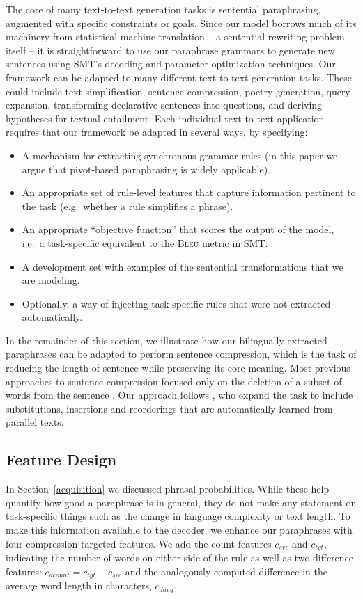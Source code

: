 \documentclass[11pt]{article}
\begin{document}
The core of many text-to-text generation tasks is sentential
paraphrasing, augmented with specific constraints or goals. Since our
model borrows much of its machinery from statistical machine
translation -- a sentential rewriting problem itself -- it is
straightforward to use our paraphrase grammars to generate new
sentences using SMT's decoding and parameter optimization
techniques. Our framework can be adapted to many different
text-to-text generation tasks.  These could include text
simplification, sentence compression, poetry generation, query
expansion, transforming declarative sentences into questions, and deriving
hypotheses for textual entailment.  Each individual text-to-text
application requires that our framework be adapted in several ways, by
specifying:
\begin{itemize}
\item A mechanism for extracting synchronous grammar rules (in this
  paper we argue that pivot-based paraphrasing is widely applicable).
\item An appropriate set of rule-level features that capture
  information pertinent to the task (e.g.\ whether a rule simplifies a
  phrase).
\item An appropriate ``objective function'' that scores the output of
  the model, i.e.\ a task-specific equivalent to the \textsc{Bleu}
  metric in SMT.
\item A development set with examples of the sentential
  transformations that we are modeling.
\item Optionally, a way of injecting task-specific rules that were not
  extracted automatically.
\end{itemize} 
In the remainder of this section, we illustrate how our bilingually
extracted paraphrases can be adapted to perform sentence compression,
which is the task of reducing the length of sentence while preserving
its core meaning.  Most previous approaches to sentence compression
focused only on the deletion of a subset of words from the sentence
\cite{KnightMarcuAI02}.  Our approach follows
, who expand the task to include
substitutions, insertions and reorderings that are automatically
learned from parallel texts.

\subsection{Feature Design}
In Section~\ref{acquisition} we discussed phrasal
probabilities. While these help quantify how good a paraphrase is in
general, they do not make any statement on task-specific things such
as the change in language complexity or text length. To make this
information available to the decoder, we enhance our paraphrases with
four compression-targeted features. We add the count features
$c_{\mathit{src}}$ and $c_{\mathit{tgt}}$, indicating the number of
words on either side of the rule as well as two difference features:
$c_{\mathit{dcount}} = c_{\mathit{tgt}} - c_{\mathit{src}}$ and the
analogously computed difference in the average word length in
characters, $c_{\mathit{davg}}$.
\end{document}
